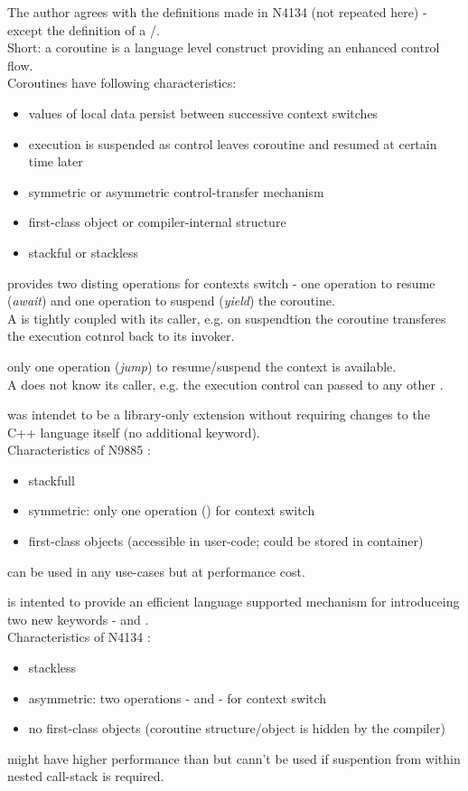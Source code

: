 The author agrees with the definitions made in N4134 (not repeated here) -
except the definition of a \fiber/\uthread.\\
Short: a coroutine is a language level construct providing an enhanced
control flow.\\
\newline
Coroutines have following characteristics\cite{N3985}:
\begin{itemize}
    \item values of local data persist between successive context switches
    \item execution is suspended as control leaves coroutine and resumed at
          certain time later
    \item symmetric or asymmetric control-transfer mechanism
    \item first-class object or compiler-internal structure
    \item stackful or stackless
\end{itemize}

\uabschnitt{\ascoro:}
provides two disting operations for contexts switch - one operation to
resume (\textit{await}) and one operation to suspend (\textit{yield}) the
coroutine.\\
A \ascoro is tightly coupled with its caller, e.g. on suspendtion the
coroutine transferes the execution cotnrol back to its invoker.

\uabschnitt{\sycoro:}
only one operation (\textit{jump}) to resume/suspend the context is
available.\\
A \sycoro does not know its caller, e.g. the execution control can passed to
any other \sycoro.

was intendet to be a library-only extension without requiring changes to the C++
language itself (no additional keyword).\\
Characteristics of N9885 \sfcoros:
\begin{itemize}
    \item stackfull
    \item symmetric: only one operation () for
          context switch
    \item first-class objects (accessible in user-code; could be stored in
          container)
\end{itemize}
\sfcoros can be used in any use-cases but at performance cost.

is intented to provide an efficient language supported mechanism for \slcoros
introduceing two new keywords - \await and \yield.\\
Characteristics of N4134 \slcoros:
\begin{itemize}
    \item stackless
    \item asymmetric: two operations - \await and \yield - for context switch
    \item no first-class objects (coroutine structure/object is hidden by the
          compiler)
\end{itemize}
\slcoros might have higher performance than \sfcoros but cann't be used if
suspention from within nested call-stack is required.
